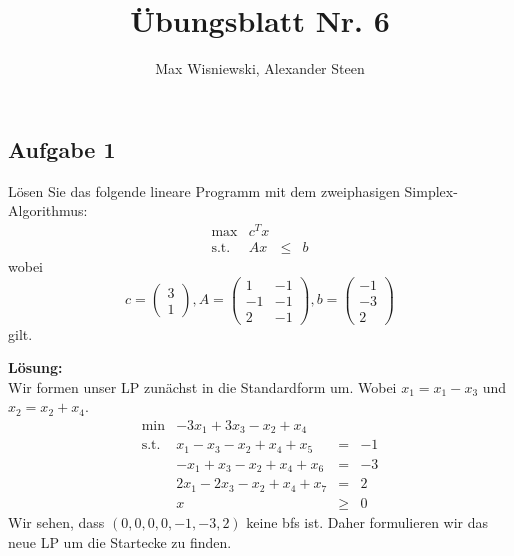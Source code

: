 \documentclass[11pt,a4paper,ngerman]{article}
\date{}
\title{Übungsblatt Nr. 6}
\author{Max Wisniewski, Alexander Steen}
\begin{document}
\renewcommand{\figurename}{Figure}
\maketitle
\thispagestyle{fancy}


\subsection*{Aufgabe 1}

Lösen Sie das folgende lineare Programm mit dem zweiphasigen Simplex-Algorithmus:
\begin{equation*}\begin{array}{rlcr}
    \max &c^Tx\\
    \text{s.t.} & A x & \leq & b
\end{array}\end{equation*}
wobei 
\begin{equation*}
c = \left( \begin{array}{c} 3 \\ 1 \end{array}\right), A = \left( \begin{array}{cc} 1 & -1 \\ -1 & -1 \\ 2 & -1\end{array}\right), b =
\left( \begin{array}{c} -1 \\ -3 \\ 2 \end{array}\right)
\end{equation*}
gilt.

\textbf{Lösung:}\\

Wir formen unser LP zunächst in die Standardform um.
Wobei $x_1 = x_1 - x_3$ und $x_2 = x_2 + x_4$.
\begin{equation*}\begin{array}{rlcr}
    \min & -3x_1 + 3x_3 - x_2 + x_4\\
    \text{s.t.} &
        x_1 - x_3 - x_2 + x_4 + x_5 & = & -1\\
    & - x_1 + x_3 - x_2 + x_4 + x_6 & = & -3\\
    & 2x_1 - 2x_3 - x_2 + x_4 + x_7 & = & 2\\
    & x & \geq & 0
\end{array}\end{equation*}
Wir sehen, dass $(0,0,0,0,-1,-3,2)$ keine bfs ist. Daher formulieren wir das neue LP um
die Startecke zu finden.
\end{document}
